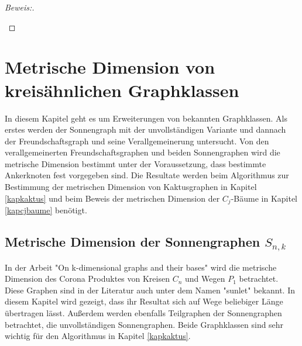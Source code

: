 \begin{proof}[Beweis:]
\begin{enumerate}
\begin{itemize}
\end{itemize}
\end{enumerate}
\end{proof}
\chapter{Metrische Dimension von kreisähnlichen Graphklassen}
\vspace{-5mm}
In diesem Kapitel geht es um Erweiterungen von bekannten Graphklassen. Als erstes werden der Sonnengraph mit der unvollständigen Variante und dannach der Freundschaftsgraph und seine Verallgemeinerung untersucht.
Von den verallgemeinerten Freundschaftsgraphen und beiden Sonnengraphen wird die metrische Dimension bestimmt unter der Voraussetzung, dass bestimmte Ankerknoten fest vorgegeben sind. Die Resultate werden beim Algorithmus zur Bestimmung der metrischen Dimension von Kaktusgraphen in Kapitel \ref{kapkaktus} und beim Beweis der metrischen Dimension der $C_j$-Bäume in Kapitel \ref{kapcjbaume} benötigt.
\vspace{-6mm}
\section{Metrische Dimension der Sonnengraphen $S_{n,k}$}
\label{chap_sonne}
In der Arbeit "On k-dimensional graphs and their bases" \cite{bases} wird die metrische Dimension des Corona Produktes von Kreisen $C_n$ und Wegen $P_1$ betrachtet. Diese Graphen sind in der Literatur auch unter dem Namen "sunlet" \cite{sunwebsite} bekannt. In diesem Kapitel wird gezeigt, dass ihr Resultat sich auf Wege beliebiger Länge übertragen lässt. Außerdem werden ebenfalls Teilgraphen der Sonnengraphen betrachtet, die unvollständigen Sonnengraphen. Beide Graphklassen sind sehr wichtig für den Algorithmus in Kapitel \ref{kapkaktus}.

